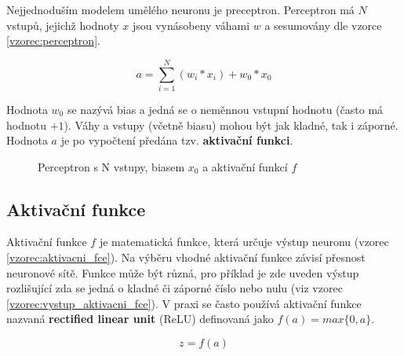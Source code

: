 Nejjednoduším modelem umělého neuronu je preceptron. Perceptron má $N$ vstupů, jejichž hodnoty $x$ jsou vynásobeny váhami $w$ a sesumovány dle vzorce \ref{vzorec:perceptron}.

\begin{equation} \label{vzorec:perceptron}
  a = \sum_{i=1}^{N} (w_i * x_i) + w_0 * x_0
\end{equation}

Hodnota $w_0$ se nazývá bias a jedná se o neměnnou vstupní hodnotu (často má hodnotu $+1$). Váhy a vstupy (včetně biasu) mohou být jak kladné, tak i záporné. Hodnota $a$ je po vypočtení předána tzv. \textbf{aktivační funkci}.

\begin{figure}[H]
  \begin{center}
  \label{obrazek:perceptron}
  \caption{Perceptron s N vstupy, biasem $x_0$ a aktivační funkcí $f$}
  \end{center}
\end{figure}

\subsection*{Aktivační funkce}
Aktivační funkce $f$ je matematická funkce, která určuje výstup neuronu (vzorec \ref{vzorec:aktivacni_fce}). Na výběru vhodné aktivační funkce závisí přesnost neuronové sítě. Funkce může být různá, pro příklad je zde uveden výstup rozlišující zda se jedná o kladné či záporné číslo nebo nulu (viz vzorec \ref{vzorec:vystup_aktivacni_fce}). V praxi se často používá aktivační funkce nazvaná \textbf{rectified linear unit} (ReLU) \cite{deeplearningbook} definovaná jako $f(a) = max\{0, a\}$.

\begin{equation} \label{vzorec:aktivacni_fce}
  z = f(a)
\end{equation}

